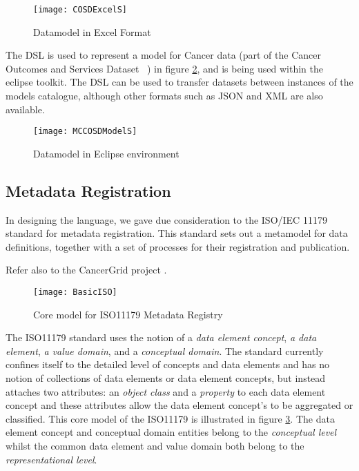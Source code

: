 \begin{figure}[here]
	\texttt{[image: COSDExcelS]}
	\caption{ Datamodel in Excel Format} 
	\label{fig:excelCOSD}
\end{figure}
The DSL is used to represent a model for Cancer data (part of the Cancer Outcomes and Services Dataset ~\cite{COSD}) in figure \ref{fig:elmcosd}, and is being used within the eclipse toolkit. The DSL can be used to transfer datasets between instances of the models catalogue, although other formats such as JSON and XML are also available.

\begin{figure}[here]
	\texttt{[image: MCCOSDModelS]}
	\caption{ Datamodel in Eclipse environment} 
	\label{fig:elmcosd}
\end{figure}

\subsection{Metadata Registration}

In designing the language, we gave due consideration to the ISO/IEC
11179 standard for metadata registration.  This standard sets out a
metamodel for data definitions, together with a set of processes for
their registration and publication.   

Refer also to the CancerGrid project \cite{crichton2009metadata}. 

\begin{figure}[here]
  \texttt{[image: BasicISO]}
  \caption{Core model for ISO11179 Metadata Registry} 
  \label{fig:basicMDR}
\end{figure}

The ISO11179 standard uses the notion of a \emph{data element
  concept}, \emph{a data element}, \emph{a value domain}, and a
\emph{conceptual domain}. The standard currently confines itself to
the detailed level of concepts and data elements and has no notion of
collections of data elements or data element concepts, but instead
attaches two attributes: an \emph{object class} and a \emph{property}
to each data element concept and these attributes allow the data
element concept's to be aggregated or classified. This core model of
the ISO11179 is illustrated in figure \ref{fig:basicMDR}. The data
element concept and conceptual domain entities belong to the
\emph{conceptual level} whilst the common data element and value
domain both belong to the \emph{representational level}.

